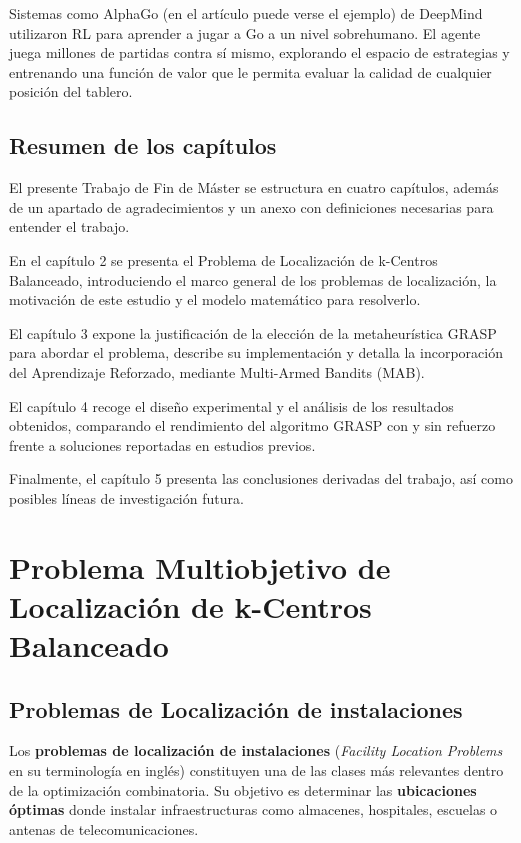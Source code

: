\documentclass[12pt,a4paper]{book}
\begin{document}
Sistemas como AlphaGo (en el artículo \cite{AlphaGo} puede verse el ejemplo) de DeepMind utilizaron RL para aprender a jugar a Go a un nivel sobrehumano.
El agente juega millones de partidas contra sí mismo, explorando el espacio de estrategias y entrenando una función de valor que le permita evaluar la calidad de cualquier posición del tablero.


\section{Resumen de los capítulos}
El presente Trabajo de Fin de Máster se estructura en cuatro capítulos, además de un apartado de agradecimientos y un anexo con definiciones necesarias para entender el trabajo.

En el capítulo 2 se presenta el Problema de Localización de k-Centros Balanceado, introduciendo el marco general de los problemas de localización, la motivación de este estudio y el modelo matemático para resolverlo.

El capítulo 3 expone la justificación de la elección de la metaheurística GRASP para abordar el problema, describe su implementación y detalla la incorporación del Aprendizaje Reforzado, mediante Multi-Armed Bandits (MAB).

El capítulo 4 recoge el diseño experimental y el análisis de los resultados obtenidos, comparando el rendimiento del algoritmo GRASP con y sin refuerzo frente a soluciones reportadas en estudios previos.

Finalmente, el capítulo 5 presenta las conclusiones derivadas del trabajo, así como posibles líneas de investigación futura.

\chapter{Problema Multiobjetivo de Localización de k-Centros Balanceado}

\section{Problemas de Localización de instalaciones}

Los \textbf{problemas de localización de instalaciones} (\textit{Facility Location Problems} en su terminología en inglés) constituyen una de las clases más relevantes dentro de la optimización combinatoria. Su objetivo es determinar las \textbf{ubicaciones óptimas} donde instalar infraestructuras como almacenes, hospitales, escuelas o antenas de telecomunicaciones.
\end{document}
